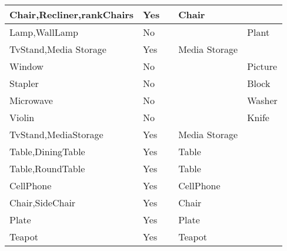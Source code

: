 \documentclass{article}
\begin{document}
\begin{longtable}{|l|l|l|l|l|}
Chair,Recliner,rankChairs                & Yes              &                                & Chair          &                             \\ \hline
Lamp,WallLamp                            & No               &                                &                & Plant                       \\ \hline
TvStand,Media Storage                    & Yes              &                                & Media Storage  &                             \\ \hline
Window                                   & No               &                                &                & Picture                     \\ \hline
Stapler                                  & No               &                                &                & Block                       \\ \hline
Microwave                                & No               &                                &                & Washer                      \\ \hline
Violin                                   & No               &                                &                & Knife                       \\ \hline
TvStand,MediaStorage                     & Yes              &                                & Media Storage  &                             \\ \hline
Table,DiningTable                        & Yes              &                                & Table          &                             \\ \hline
Table,RoundTable                         & Yes              &                                & Table          &                             \\ \hline
CellPhone                                & Yes              &                                & CellPhone      &                             \\ \hline
Chair,SideChair                          & Yes              &                                & Chair          &                             \\ \hline
Plate                                    & Yes              &                                & Plate          &                             \\ \hline
Teapot                                   & Yes              &                                & Teapot         &                             \\ \hline

\end{longtable}
\end{document}
